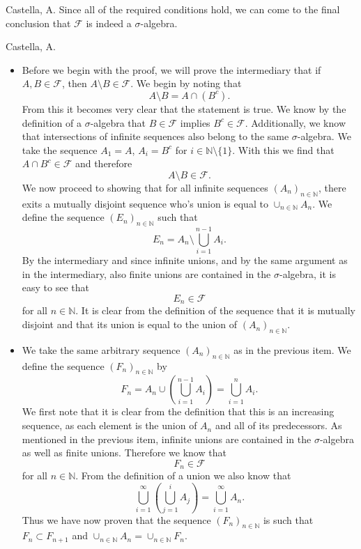 \begin{solution}[2.4]{Castella, A.}
    Since all of the required conditions hold, we can come to the final conclusion that $\mathcal{F}$ is indeed a $\sigma$-algebra.
\end{solution}

\begin{solution}[2.5]{Castella, A.}
\begin{itemize}
    \item Before we begin with the proof, we will prove the intermediary that if $A,B \in \mathcal{F}$, then $A \setminus B \in \mathcal{F}$. We begin by noting that
    $$
        A \setminus B = A \cap (B^c).
    $$
    From this it becomes very clear that the statement is true. We know by the definition of a $\sigma$-algebra that $B \in \mathcal{F}$ implies $B^c \in \mathcal{F}$. Additionally, we know that intersections of infinite sequences also belong to the same $\sigma$-algebra. We take the sequence $A_1 = A$, $A_i = B^c$ for $i \in \mathbb{N}\setminus\{1\}$. With this we find that $A \cap B^c \in \mathcal{F}$ and therefore
    $$
        A\setminus B \in \mathcal{F}.
    $$
    We now proceed to showing that for all infinite sequences $(A_n)_{n\in\mathbb{N}}$, there exits a mutually disjoint sequence who's union is equal to $\cup_{n\in\mathbb{N}}A_n$. We define the sequence $(E_n)_{n\in\mathbb{N}}$ such that
    $$
        E_n = A_n \setminus \bigcup_{i=1}^{n-1}A_i.
    $$
    By the intermediary and since infinite unions, and by the same argument as in the intermediary, also finite unions are contained in the $\sigma$-algebra, it is easy to see that
    $$
        E_n \in \mathcal{F}
    $$
    for all $n\in\mathbb{N}$. It is clear from the definition of the sequence that it is mutually disjoint and that its union is equal to the union of $(A_n)_{n\in\mathbb{N}}$.
    \item We take the same arbitrary sequence $(A_n)_{n\in\mathbb{N}}$ as in the previous item. We define the sequence $(F_n)_{n\in\mathbb{N}}$ by
    $$
        F_n = A_n \cup \left(\bigcup_{i=1}^{n-1}A_i\right) = \bigcup_{i=1}^n A_i.
    $$
    We first note that it is clear from the definition that this is an increasing sequence, as each element is the union of $A_n$ and all of its predecessors. As mentioned in the previous item, infinite unions are contained in the $\sigma$-algebra as well as finite unions. Therefore we know that
    $$
        F_n \in \mathcal{F}
    $$
    for all $n \in \mathbb{N}$. From the definition of a union we also know that
    $$
        \bigcup_{i=1}^\infty \left(\bigcup_{j=1}^i A_j\right) = \bigcup_{i=1}^\infty A_n.
    $$
    Thus we have now proven that the sequence $(F_n)_{n\in\mathbb{N}}$ is such that $F_n \subset F_{n+1}$ and $\cup_{n\in\mathbb{N}}A_n = \cup_{n\in\mathbb{N}}F_n$.
\end{itemize}
\end{solution}

